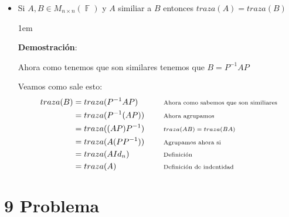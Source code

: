 \documentclass[12pt, fleqn]{article}                             %
\newenvironment{SmallIndentation}[1][0.75em]                    %
        {\begin{adjustwidth}{#1}{}\begin{footnotesize}}             %
        {\end{footnotesize}\end{adjustwidth}}                       %
\DeclareMathOperator \Space {\quad}                             %
\newcommand \Remember[1]{\Space\text{\scriptsize{#1}}}          %
\theoremstyle{break}                                            %
\DeclareMathOperator \GenericField {\mathbb{F}}                 %
\begin{document}
\begin{itemize}
        \item
            Si $A, B \in M_{n \times n}(\GenericField)$ y $A$ similiar a $B$ entonces $traza(A) = traza(B)$
            \begin{SmallIndentation}[1em]
                \textbf{Demostración}:

                Ahora como tenemos que son similares tenemos que $B = P^{-1}AP$
                
                Veamos como sale esto:
                \begin{align*}
                    traza(B)
                        &= traza(P^{-1}AP)                                          
                            && \Remember{Ahora como sabemos que son similiares}     \\
                        &= traza(P^{-1}(AP))                                          
                            && \Remember{Ahora agrupamos}                           \\
                        &= traza((AP)P^{-1})                                          
                            && \Remember{$traza(AB) = traza(BA)$}                   \\
                        &= traza(A(PP^{-1}))                                          
                            && \Remember{Agrupamos ahora si}                        \\
                        &= traza(AId_n)                                          
                            && \Remember{Definición}                                \\
                        &= traza(A)                                        
                            && \Remember{Definición de indentidad}
                \end{align*}
            
            \end{SmallIndentation}

    \end{itemize}



\clearpage
\section{9 Problema}
\end{document}
